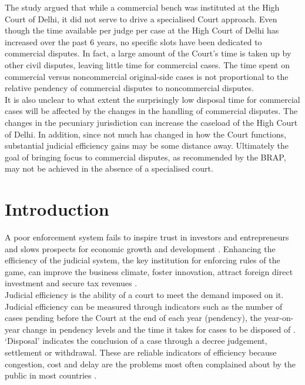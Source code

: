 \documentclass[a4paper, 12pt, twoside]{article}
\begin{document}
The study argued that while a commercial bench was instituted at the High Court of Delhi, it did not serve to drive a specialised Court approach. Even though the time available per judge per case at the High Court of Delhi has increased over the past 6 years, no specific slots have been dedicated to commercial disputes. In fact, a large amount of the Court’s time is taken up by other civil disputes, leaving little time for commercial cases. The time spent on commercial versus noncommercial original-side cases is not proportional to the relative pendency of commercial disputes to noncommercial disputes.\\

It is also unclear to what extent the surprisingly low disposal time for commercial cases will be affected by the changes in the handling of commercial disputes. The changes in the pecuniary jurisdiction can increase the caseload of the High Court of Delhi. In addition, since not much has changed in how the Court functions, substantial judicial efficiency gains may be some distance away. Ultimately the goal of bringing focus to commercial disputes, as recommended by the BRAP, may not be achieved in the absence of a specialised court.


\newpage
\section{Introduction}

A poor enforcement system fails to inspire trust in investors and entrepreneurs and slows prospects for economic growth and development \parencite{kennethpaper}. Enhancing the efficiency of the judicial system, the key institution for enforcing rules of the game, can improve the business climate, foster innovation, attract foreign direct investment and secure tax revenues \parencite{espositopaper}. \\

Judicial efficiency is the ability of a court to meet the demand imposed on it. Judicial efficiency can be measured through indicators such as the number of cases pending before the Court at the end of each year (pendency), the year-on-year change in pendency levels and the time it takes for cases to be disposed of \parencite{dakoliapapers}. ‘Disposal’ indicates the conclusion of a case through a decree judgement, settlement or withdrawal. These are reliable indicators of efficiency because congestion, cost and delay are the problems most often complained about by the public in most countries \parencite{buscagliareport, dakoliapapers}. \\
\end{document}

